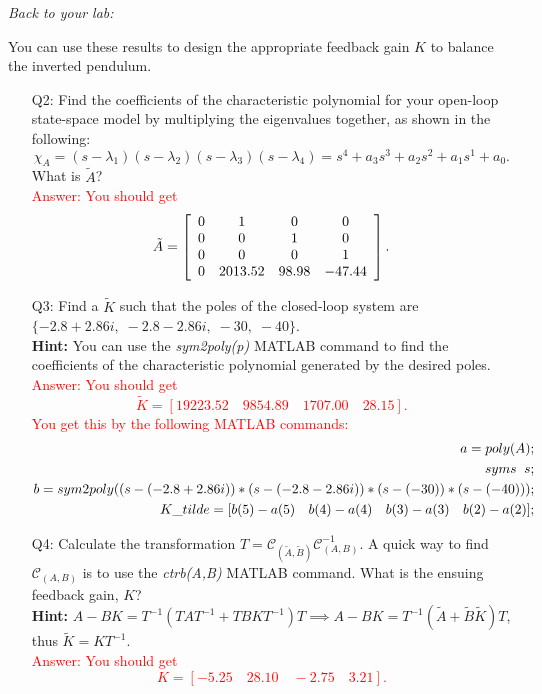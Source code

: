 \documentclass[12pt]{report}
\newcommand\drew[1]{\textcolor{red}{#1}}
\begin{document}
\noindent \emph{Back to your lab:}

You can use these results to design the appropriate feedback gain $K$ to balance the inverted pendulum.
\begin{enumerate}[Question]
    \item[Q2:] Find the coefficients of the characteristic polynomial for your open-loop state-space model by multiplying the eigenvalues together, as shown in the following:
          \[
              \chi_{A} = (s-\lambda_1)(s-\lambda_2)(s-\lambda_3)(s-\lambda_4) = s^4 + a_3 s^3 + a_2 s^2 + a_1 s^1 + a_0.
          \]
          What is $\tilde{A}$?\\
          \drew{Answer: You should get
              \[
                  \tilde{A} =
                  \left[\begin{array}{c c c c}
                          0 & 1       & 0     & 0      \\
                          0 & 0       & 1     & 0      \\
                          0 & 0       & 0     & 1      \\
                          0 & 2013.52 & 98.98 & -47.44
                      \end{array}\right].
              \]
          }
    \item[Q3:] Find a $\tilde{K}$ such that the poles of the closed-loop system are $\{-2.8 + 2.86i, \; -2.8 - 2.86i, \; -30, \; -40\}$.\\
          \textbf{Hint:} You can use the \emph{sym2poly(p)} MATLAB command to find the coefficients of the characteristic polynomial generated by the desired poles.\\
          \drew{Answer: You should get
          \[
              \tilde{K} = [19223.52 \quad 9854.89 \quad 1707.00 \quad 28.15].
          \]
          You get this by the following MATLAB commands:
          \[\begin{aligned}
                  a=poly(A);                                                             \\
                  syms \hspace{2mm}s;                                                    \\
                  b=sym2poly((s-(-2.8 + 2.86i))*(s-(-2.8 - 2.86i))*(s-(-30))*(s-(-40))); \\
                  K\_tilde = [b(5)-a(5)\quad b(4)-a(4)\quad b(3)-a(3)\quad b(2)-a(2)];
              \end{aligned}\]
          }
    \item[Q4:] Calculate the transformation $T=\mathcal{C}_{(\tilde{A},\tilde{B})} \mathcal{C}_{(A,B)}^{-1}$. A quick way to find $\mathcal{C}_{(A,B)}$ is to use the \emph{ctrb(A,B)} MATLAB command. What is the ensuing feedback gain, $K$?\\
          \textbf{Hint:} $A-BK= T^{-1}(TAT^{-1} + TBKT^{-1})T \implies A-BK = T^{-1}(\tilde{A}+\tilde{B}\tilde{K})T$, thus $\tilde{K}=KT^{-1}$.\\
          \drew{Answer: You should get
          \[
              K = [-5.25 \quad 28.10 \quad -2.75 \quad 3.21].
          \]
          }
\end{enumerate}
\end{document}
